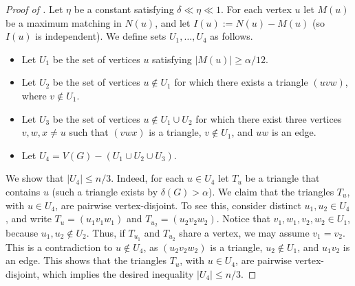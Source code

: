 \documentclass[10pt,a4paper]{amsart}
\begin{document}
		\begin{proof}[Proof of ]
			Let $\eta$ be a constant satisfying $\delta \ll \eta \ll 1$.
			For each vertex $u$ let $M(u)$ be a maximum matching in $N(u)$, and let $I(u) := N(u) - M(u)$ (so $I(u)$ is independent).
			We define sets $U_1, \ldots, U_4$ as follows. 
			\begin{itemize}
				\item
					Let $U_1$ be the set of vertices $u$ satisfying $|M(u)| \ge \alpha/12$.
				\item
					Let $U_2$ be the set of vertices $u \notin U_1$ for which there exists a triangle $(uvw)$, where $v \notin U_1$. 
				\item
					Let $U_3$ be the set of vertices $u \notin U_1 \cup U_2$ for which there exist three vertices $v,w,x \neq u$ such that $(vwx)$ is a triangle, $v \notin U_1$, and $uw$ is an edge.
				\item
					Let $U_4 = V(G) - (U_1 \cup U_2 \cup U_3)$.
			\end{itemize}
			We show that $|U_4| \le n/3$.
			Indeed, for each $u \in U_4$ let $T_u$ be a triangle that contains $u$ (such a triangle exists by $\delta(G) > \alpha$). 
			We claim that the triangles $T_u$, with $u \in U_4$, are pairwise vertex-disjoint.
			To see this, consider distinct $u_1,u_2 \in U_4$, and write $T_u = (u_1v_1w_1)$ and $T_{u_2} = (u_2v_2w_2)$. Notice that $v_1,w_1,v_2,w_2 \in U_1$, because $u_1,u_2 \notin U_2$. Thus, if $T_{u_1}$ and $T_{u_2}$ share a vertex, we may assume $v_1 = v_2$. This is a contradiction to $u \notin U_4$, as $(u_2v_2w_2)$ is a triangle, $u_2 \notin U_1$, and $u_1v_2$ is an edge.
			This shows that the triangles $T_u$, with $u \in U_4$, are pairwise vertex-disjoint, which implies the desired inequality $|U_4| \le n/3$.


\end{proof}
\end{document}
